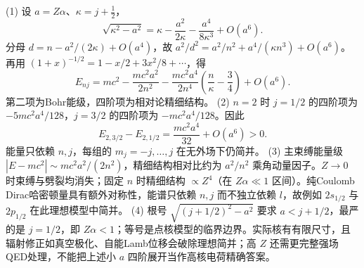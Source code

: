 (1) 设 \(a=Z\alpha\)、\(\kappa=j+\tfrac12\)，
\[
\sqrt{\kappa^2-a^2}=\kappa-\frac{a^2}{2\kappa}-\frac{a^4}{8\kappa^3}+O(a^6).
\]
分母 \(d=n-a^2/(2\kappa)+O(a^4)\)，故 \(a^2/d^2=a^2/n^2+a^4/(\kappa n^3)+O(a^6)\)。再用 \((1+x)^{-1/2}=1-x/2+3x^2/8+\cdots\)，得
\[
E_{nj}=mc^2-\frac{mc^2a^2}{2n^2}-\frac{mc^2a^4}{2n^4}\left(\frac n\kappa-\frac34\right)+O(a^6).
\]
第二项为Bohr能级，四阶项为相对论精细结构。
(2) \(n=2\) 时 \(j=1/2\) 的四阶项为 \(-5mc^2a^4/128\)，\(j=3/2\) 的四阶项为 \(-mc^2a^4/128\)。因此
\[
E_{2,3/2}-E_{2,1/2}=\frac{mc^2a^4}{32}+O(a^6)>0.
\]
能量只依赖 \(n,j\)，每组的 \(m_j=-j,\ldots,j\) 在无外场下仍简并。
(3) 主束缚能量级 \(|E-mc^2|\sim mc^2a^2/(2n^2)\)，精细结构相对比约为 \(a^2/n^2\) 乘角动量因子。\(Z\to0\) 时束缚与劈裂均消失；固定 \(n\) 时精细结构 \(\propto Z^4\)（在 \(Z\alpha\ll1\) 区间）。纯Coulomb Dirac哈密顿量具有额外对称性，能谱只依赖 \(n,j\) 而不独立依赖 \(l\)，故例如 \(2s_{1/2}\) 与 \(2p_{1/2}\) 在此理想模型中简并。
(4) 根号 \(\sqrt{(j+1/2)^2-a^2}\) 要求 \(a<j+1/2\)，最严的是 \(j=1/2\)，即 \(Z\alpha<1\)；等号是点核模型的临界边界。实际核有有限尺寸，且辐射修正如真空极化、自能Lamb位移会破除理想简并；高 \(Z\) 还需更完整强场QED处理，不能把上述小 \(a\) 四阶展开当作高核电荷精确答案。

